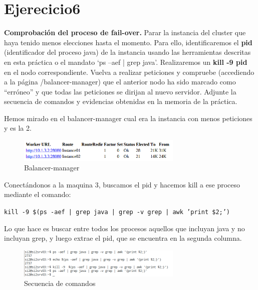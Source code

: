\documentclass[a4paper, 10pt]{article}
\begin{document}
\newpage
\vspace{-1cm}
\section{Ejerecicio6}
\begin{mdframed}
	\textbf{Comprobación del proceso de fail-over.} Parar la instancia del cluster que haya tenido
	menos elecciones hasta el momento. Para ello, identificaremos el \textbf{pid} (identificador del proceso java) de la
	instancia usando las herramientas descritas en esta práctica o el mandato ‘ps –aef | grep java’.
	Realizaremos un \textbf{kill -9 pid} en el nodo correspondiente. Vuelva a realizar peticiones y compruebe
	(accediendo a la página /balancer-manager) que el anterior nodo ha sido marcado como “erróneo” y que
	todas las peticiones se dirijan al nuevo servidor. Adjunte la secuencia de comandos y evidencias obtenidas
	en la memoria de la práctica. 
\end{mdframed}

Hemos mirado en el balancer-manager cual era la instancia con menos peticiones y es la 2.

\begin{figure}[hbtp]
	\centering
	\includegraphics[width=0.7\textwidth]{../../P3/pantallazos/ej6-balancer1.png}
	\caption { Balancer-manager }
\end{figure}

Conectándonos a la maquina 3, buscamos el pid y hacemos kill a ese proceso mediante el comando: 

\texttt{kill -9 \$(ps -aef | grep java | grep -v grep | awk '{print \$2;}')}

Lo que hace es buscar entre todos los procesos aquellos que incluyan java y no incluyan grep, y luego extrae el pid, que se encuentra en la segunda columna.

\begin{figure}[hbtp]
	\centering
	\includegraphics[width=0.7\textwidth]{../../P3/pantallazos/ej6-comandos.png}
	\caption { Secuencia de comandos }
\end{figure}
\end{document}
